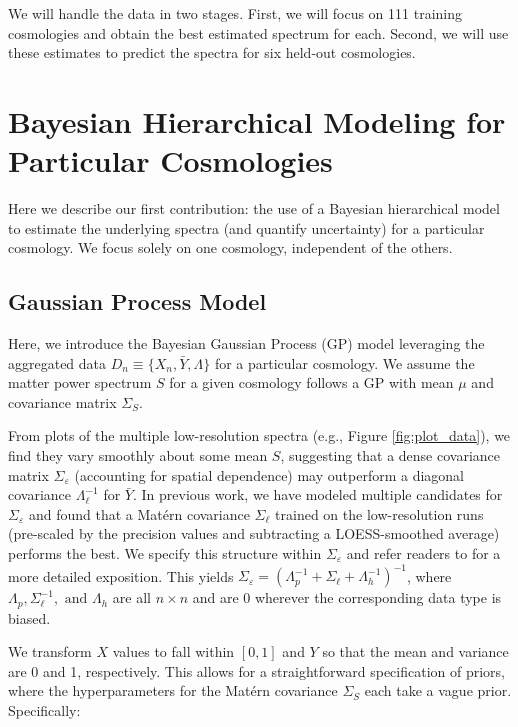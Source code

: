\documentclass[11pt]{article}
\begin{document}
We will handle the data in two stages.  First, we will focus on 111 training cosmologies 
and obtain the best estimated spectrum for each.  Second, we will use these estimates 
to predict the spectra for six held-out cosmologies.

\section{Bayesian Hierarchical Modeling for Particular Cosmologies}
\label{sec:hm_fit}

Here we describe our first contribution: the use of a Bayesian hierarchical model 
to estimate the underlying spectra (and quantify uncertainty) for a particular cosmology.  
We focus solely on one cosmology, independent of the others.

\subsection{Gaussian Process Model}

Here, we introduce the Bayesian Gaussian Process (GP) model leveraging the aggregated 
data $D_n \equiv \{X_n, \bar Y, \Lambda\}$ for a particular cosmology. We assume 
the matter power spectrum $S$ for a given cosmology follows a GP with mean $\mu$ 
and covariance matrix $\Sigma_S$.

From plots of the multiple low-resolution spectra (e.g., Figure \ref{fig:plot_data}), 
we find they vary smoothly about some mean $S$, suggesting that a dense covariance 
matrix $\Sigma_\varepsilon$ (accounting for spatial dependence) may outperform a 
diagonal covariance $\Lambda_\ell^{-1}$ for $\bar Y$. In previous work, we have 
modeled multiple candidates for $\Sigma_\varepsilon$ \citep{walsh2023bayesian} and 
found that a Mat\'ern covariance $\Sigma_\ell$ trained on the low-resolution runs 
(pre-scaled by the precision values and subtracting a LOESS-smoothed average) performs 
the best. We specify this structure within $\Sigma_\varepsilon$ and refer readers 
to \cite{walsh2023bayesian} for a more detailed exposition. This yields 
$\Sigma_\varepsilon=\left(\Lambda_p^{-1} + \Sigma_\ell + \Lambda_h^{-1}\right)^{-1}$, 
where $\Lambda_p, \Sigma_\ell^{-1}, \text{ and } \Lambda_h$ are all $n\times n$ 
and are 0 wherever the corresponding data type is biased.

We transform $X$ values to fall within $[0,1]$ and $Y$ so that the mean and variance 
are 0 and 1, respectively. This allows for a straightforward specification of priors, 
where the hyperparameters for the Mat\'ern covariance $\Sigma_S$ each take a vague prior. 
Specifically:
\end{document}
